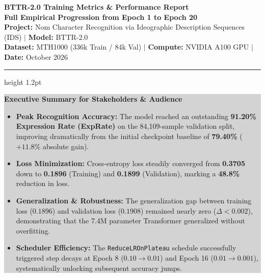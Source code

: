\documentclass[11pt,a4paper]{article}
\begin{document}
\begin{center}
    {\LARGE \textbf{\color{primary} BTTR-2.0 Training Metrics \& Performance Report}} \\[0.4em]
    {\large \textbf{Full Empirical Progression from Epoch 1 to Epoch 20}} \\[0.6em]
    {\small \textbf{Project:} Nom Character Recognition via Ideographic Description Sequences (IDS) \quad $\vert$ \quad \textbf{Model:} BTTR-2.0} \\
    {\small \textbf{Dataset:} MTH1000 (336k Train / 84k Val) \quad $\vert$ \quad \textbf{Compute:} NVIDIA A100 GPU \quad $\vert$ \quad \textbf{Date:} October 2026}
\end{center}

\vspace{-0.5em}
\hrule height 1.2pt
\vspace{1em}

\noindent
\colorbox{lightgray}{
\parbox{0.97\textwidth}{
    \vspace{0.4em}
    \textbf{\color{primary}\large Executive Summary for Stakeholders \& Audience}
    \vspace{0.3em}
    \begin{itemize}[leftmargin=1.5em, itemsep=2pt]
        \item \textbf{Peak Recognition Accuracy:} The model reached an outstanding \textbf{91.20\% Expression Rate (ExpRate)} on the 84,109-sample validation split, improving dramatically from the initial checkpoint baseline of \textbf{79.40\%} ($+11.8\%$ absolute gain).
        \item \textbf{Loss Minimization:} Cross-entropy loss steadily converged from \textbf{0.3705} down to \textbf{0.1896} (Training) and \textbf{0.1899} (Validation), marking a \textbf{48.8\%} reduction in loss.
        \item \textbf{Generalization \& Robustness:} The generalization gap between training loss ($0.1896$) and validation loss ($0.1908$) remained nearly zero ($\Delta < 0.002$), demonstrating that the 7.4M parameter Transformer generalized without overfitting.
        \item \textbf{Scheduler Efficiency:} The \texttt{ReduceLROnPlateau} schedule successfully triggered step decays at Epoch 8 ($0.10 \to 0.01$) and Epoch 16 ($0.01 \to 0.001$), systematically unlocking subsequent accuracy jumps.
    \end{itemize}
    \vspace{0.2em}
}
}
\end{document}
